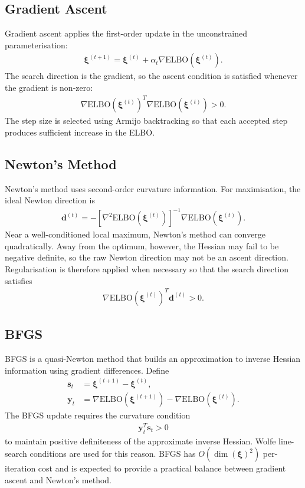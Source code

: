 \documentclass[11pt,a4paper]{article}
\newcommand{\ELBO}{\text{ELBO}}
\begin{document}
\subsection{Gradient Ascent}

Gradient ascent applies the first-order update in the unconstrained parameterisation:
\begin{align}
\bm{\xi}^{(t+1)} = \bm{\xi}^{(t)} + \alpha_t \nabla\ELBO(\bm{\xi}^{(t)}).
\end{align}
The search direction is the gradient, so the ascent condition is satisfied whenever the gradient is non-zero:
\begin{align}
\nabla\ELBO(\bm{\xi}^{(t)})^T \nabla\ELBO(\bm{\xi}^{(t)}) > 0.
\end{align}
The step size is selected using Armijo backtracking so that each accepted step produces sufficient increase in the ELBO.

\subsection{Newton's Method}

Newton's method uses second-order curvature information. For maximisation, the ideal Newton direction is
\begin{align}
\bm{d}^{(t)} = -[\nabla^2\ELBO(\bm{\xi}^{(t)})]^{-1}\nabla\ELBO(\bm{\xi}^{(t)}).
\end{align}
Near a well-conditioned local maximum, Newton's method can converge quadratically. Away from the optimum, however, the Hessian may fail to be negative definite, so the raw Newton direction may not be an ascent direction. Regularisation is therefore applied when necessary so that the search direction satisfies
\begin{align}
\nabla\ELBO(\bm{\xi}^{(t)})^T\bm{d}^{(t)} > 0.
\end{align}

\subsection{BFGS}

BFGS is a quasi-Newton method that builds an approximation to inverse Hessian information using gradient differences. Define
\begin{align}
\bm{s}_t &= \bm{\xi}^{(t+1)} - \bm{\xi}^{(t)},\\
\bm{y}_t &= \nabla\ELBO(\bm{\xi}^{(t+1)}) - \nabla\ELBO(\bm{\xi}^{(t)}).
\end{align}
The BFGS update requires the curvature condition
\begin{align}
\bm{y}_t^T\bm{s}_t > 0
\end{align}
to maintain positive definiteness of the approximate inverse Hessian. Wolfe line-search conditions are used for this reason. BFGS has $O(\dim(\bm{\xi})^2)$ per-iteration cost and is expected to provide a practical balance between gradient ascent and Newton's method.
\end{document}

